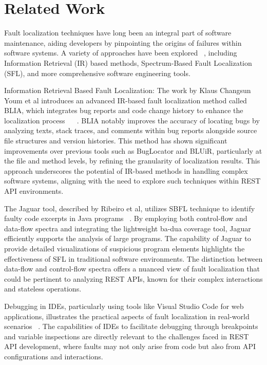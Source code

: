 \documentclass[conference]{IEEEtran}
\begin{document}
\section{Related Work}
\label{sec:relatedwork}

Fault localization techniques have long been an integral part of software maintenance, aiding developers by pinpointing the origins of failures within software systems. 
A variety of approaches have been explored ~\cite{Wong2023_Software_Fault_localization}, including Information Retrieval (IR) based methods, Spectrum-Based Fault Localization (SFL), and more comprehensive software engineering tools.

Information Retrieval Based Fault Localization: The work by Klaus Changsun Youm et al introduces an advanced IR-based fault localization method called BLIA, which integrates bug reports and code change history to enhance the localization process  ~\cite{7467300} ~\cite{ctx114059874780001451}. BLIA notably improves the accuracy of locating bugs by analyzing texts, stack traces, and comments within bug reports alongside source file structures and version histories. This method has shown significant improvements over previous tools such as BugLocator and BLUiR, particularly at the file and method levels, by refining the granularity of localization results. This approach underscores the potential of IR-based methods in handling complex software systems, aligning with the need to explore such techniques within REST API environments.

The Jaguar tool, described by Ribeiro et al, utilizes SBFL technique to identify faulty code excerpts in Java programs ~\cite{8367068}. By employing both control-flow and data-flow spectra and integrating the lightweight ba-dua coverage tool, Jaguar efficiently supports the analysis of large programs. The capability of Jaguar to provide detailed visualizations of suspicious program elements highlights the effectiveness of SFL in traditional software environments. The distinction between data-flow and control-flow spectra offers a nuanced view of fault localization that could be pertinent to analyzing REST APIs, known for their complex interactions and stateless operations.

Debugging in IDEs, particularly using tools like Visual Studio Code for web applications, illustrates the practical aspects of fault localization in real-world scenarios ~\cite{DebuggingCode}. The capabilities of IDEs to facilitate debugging through breakpoints and variable inspections are directly relevant to the challenges faced in REST API development, where faults may not only arise from code but also from API configurations and interactions.
\end{document}
